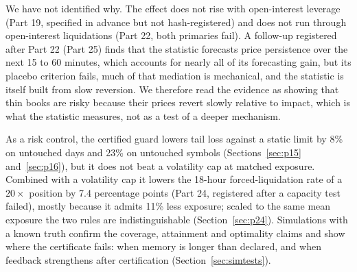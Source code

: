 \documentclass[12pt]{article}
\theoremstyle{definition}
\theoremstyle{remark}
\begin{document}
We have not identified why. The effect does not rise with open-interest leverage (Part 19, specified in advance but not hash-registered) and does not run through open-interest liquidations (Part 22, both primaries fail). A follow-up registered after Part 22 (Part 25) finds that the statistic forecasts price persistence over the next 15 to 60 minutes, which accounts for nearly all of its forecasting gain, but its placebo criterion fails, much of that mediation is mechanical, and the statistic is itself built from slow reversion. We therefore read the evidence as showing that thin books are risky because their prices revert slowly relative to impact, which is what the statistic measures, not as a test of a deeper mechanism.

As a risk control, the certified guard lowers tail loss against a static limit by 8\% on untouched days and 23\% on untouched symbols (Sections~\ref{sec:p15} and~\ref{sec:p16}), but it does not beat a volatility cap at matched exposure. Combined with a volatility cap it lowers the 18-hour forced-liquidation rate of a $20\times$ position by 7.4 percentage points (Part 24, registered after a capacity test failed), mostly because it admits 11\% less exposure; scaled to the same mean exposure the two rules are indistinguishable (Section~\ref{sec:p24}). Simulations with a known truth confirm the coverage, attainment and optimality claims and show where the certificate fails: when memory is longer than declared, and when feedback strengthens after certification (Section~\ref{sec:simtests}).
\end{document}
